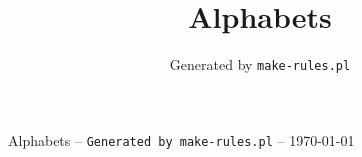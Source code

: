 \documentclass{article}
\begin{document}
\title{Alphabets}
\author{Generated by \tt make-rules.pl}
\begin{center}
  {\LARGE Alphabets} --
  \texttt{\Large Generated by \tt make-rules.pl} --
  \large \today
\end{center}
\tableofcontents
\newpage

\end{document}
